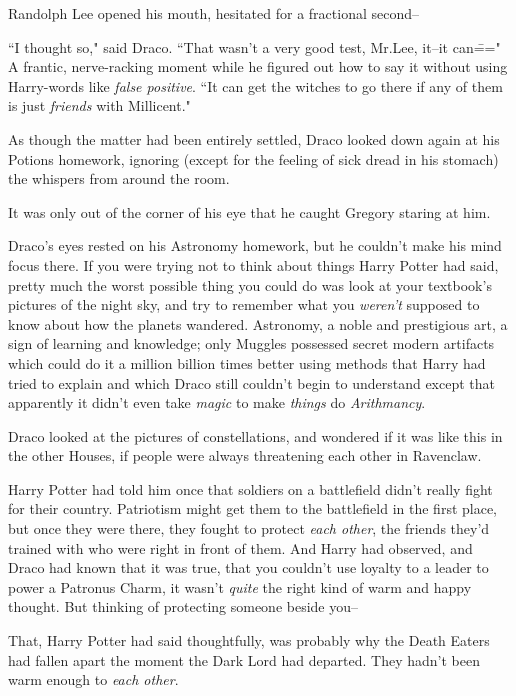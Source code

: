 Randolph Lee opened his mouth, hesitated for a fractional second\---

``I thought so," said Draco. ``That wasn't a very good test, Mr.\?Lee, it\---it can\===" A frantic, nerve-racking moment while he figured out how to say it without using Harry-words like \emph{false positive}. ``It can get the witches to go there if any of them is just \emph{friends} with Millicent."

As though the matter had been entirely settled, Draco looked down again at his Potions homework, ignoring (except for the feeling of sick dread in his stomach) the whispers from around the room.

It was only out of the corner of his eye that he caught Gregory staring at him.

\later

Draco's eyes rested on his Astronomy homework, but he couldn't make his mind focus there. If you were trying not to think about things Harry Potter had said, pretty much the worst possible thing you could do was look at your textbook's pictures of the night sky, and try to remember what you \emph{weren't} supposed to know about how the planets wandered. Astronomy, a noble and prestigious art, a sign of learning and knowledge; only Muggles possessed secret modern artifacts which could do it a million billion times better using methods that Harry had tried to explain and which Draco still couldn't begin to understand except that apparently it didn't even take \emph{magic} to make \emph{things} do \emph{Arithmancy}.

Draco looked at the pictures of constellations, and wondered if it was like this in the other Houses, if people were always threatening each other in Ravenclaw.

Harry Potter had told him once that soldiers on a battlefield didn't really fight for their country. Patriotism might get them to the battlefield in the first place, but once they were there, they fought to protect \emph{each other}, the friends they'd trained with who were right in front of them. And Harry had observed, and Draco had known that it was true, that you couldn't use loyalty to a leader to power a Patronus Charm, it wasn't \emph{quite} the right kind of warm and happy thought. But thinking of protecting someone beside you\---

That, Harry Potter had said thoughtfully, was probably why the Death Eaters had fallen apart the moment the Dark Lord had departed. They hadn't been warm enough to \emph{each other}.

